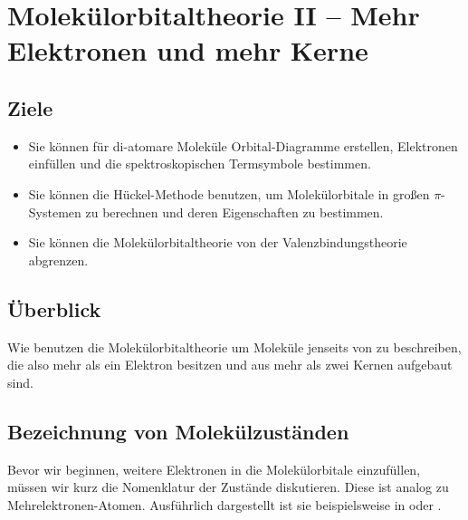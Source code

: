 
\renewcommand{\chapterauthors}{Markus Lippitz}
\renewcommand{\lastmod}{7. November 2021}

\chapter{Molekülorbitaltheorie II -- Mehr Elektronen und mehr Kerne}

\label{chap:MO-teil2}


\section{Ziele}

\begin{itemize}
\item Sie können für di-atomare Moleküle Orbital-Diagramme erstellen, Elektronen einfüllen und die spektroskopischen Termsymbole bestimmen.

\item Sie können die Hückel-Methode benutzen, um Molekülorbitale in großen $\pi$-Systemen zu berechnen und deren Eigenschaften zu bestimmen.

\item Sie können die Molekülorbitaltheorie von der Valenzbindungstheorie abgrenzen.

\end{itemize}

\section{Überblick}

Wie benutzen die Molekülorbitaltheorie um Moleküle jenseits von  zu beschreiben, die also mehr als ein Elektron besitzen und aus mehr als zwei Kernen aufgebaut sind.



\section{Bezeichnung von Molekülzuständen}






Bevor wir beginnen, weitere Elektronen in die Molekülorbitale einzufüllen, müssen wir kurz die Nomenklatur der Zustände diskutieren. Diese ist analog zu Mehrelektronen-Atomen. Ausführlich dargestellt ist sie beispielsweise in \cite{Demtröder_molekuelphysik} oder \cite{Demtröder_AMP}.



